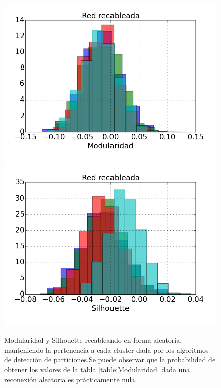 \begin{figure}
\centering
\includegraphics[scale = 0.5]{Modularidad_random}
\includegraphics[scale = 0.5]{Silhouette_random}
\caption{Modularidad y Silhouette recableando en forma aleatoria, manteniendo la pertenencia a cada cluster dada por los algoritmos de detección de particiones.Se puede observar que la probabilidad de obtener los valores de la tabla \ref{table:Modularidad} dada una reconexión aleatoria es prácticamente nula.}
\label{fig:Modularidad_random}
\end{figure}
